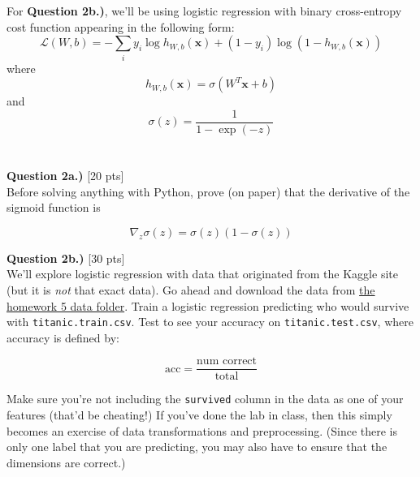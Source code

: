 \documentclass[paper=a4, fontsize=11pt]{scrartcl} %
\begin{document}
For \textbf{Question 2b.)}, we'll be using logistic regression with binary cross-entropy cost function appearing in the following form: \\

\begin{equation}
    \mathcal{L}(W, b) = -\sum_i y_i \log{ h_{W,b}(\textbf{x}) } + (1 - y_i) \log{( 1 - h_{W,b}(\textbf{x})) } \nonumber
\end{equation}
where 
\begin{equation}
h_{W,b}(\textbf{x}) = \sigma \left( W^T\textbf{x} + b \right) \nonumber
\end{equation}
and
\begin{equation}
\sigma(z) = \frac{1}{1 - \exp(-z)} \nonumber
\end{equation} \\
\\

\vspace{1cm}
{\Large \textbf{Question 2a.)} [20 pts]} \\

Before solving anything with Python, prove (on paper) that the derivative of the sigmoid function is 

\begin{equation}
    \nabla_z \sigma(z) = \sigma(z) \left(1 - \sigma(z)\right) \nonumber
\end{equation}

\vspace{1cm}
{\Large \textbf{Question 2b.)} [30 pts]} \\

We'll explore logistic regression with data that originated from the Kaggle site (but it is \emph{not} that exact data). Go ahead and download the data from \href{https://course.ccs.neu.edu/cs6220/homework-5/data/titanic/}{the homework 5 data folder}. Train a logistic regression predicting who would survive with \verb"titanic.train.csv". Test to see your accuracy on \verb"titanic.test.csv", where accuracy is defined by:

\begin{equation}
    \text{acc} = \frac{\text{num correct}}{\text{total}}
\end{equation}

Make sure you're not including the \verb"survived" column in the data as one of your features (that'd be cheating!) If you've done the lab in class, then this simply becomes an exercise of data transformations and preprocessing. (Since there is only one label that you are predicting, you may also have to ensure that the dimensions are correct.) \\
\end{document}
